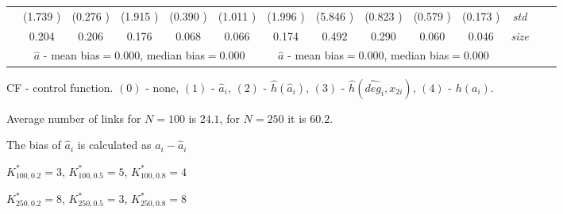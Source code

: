 \begin{table}
\begin{threeparttable}
{\begin{tabular}{|c|c|c|c|c|c|c|c|c|c|c|c|c|c|}
&(1.739 )&(0.276 )&(1.915 )&(0.390 )&(1.011 )&(1.996 )&(5.846 )&(0.823 )&(0.579 )&(0.173 )&\textit{std}\\ 
& 0.204 & 0.206 &0.176 &0.068 &0.066 &0.174& 0.492& 0.290 &0.060 &0.046 &\textit{size} \\\midrule 
&\multicolumn{5}{|c|}{$\hat{a}$ - mean bias$=$0.000, median bias$=$0.000 }&\multicolumn{5}{|c|}{$\hat{a}$ - mean bias$=$0.000, median bias$=$0.000 }&\\ \hline 
\end{tabular}} 
\begin{tablenotes}\tiny 
\item CF - control function. $(0)$ - none, $(1)$ - $\hat{a}_i$,  $(2)$ - $\hat{h}(\hat{a}_i)$, $(3)$ - $\hat{h}(\widehat{deg}_i,x_{2i})$, $(4)$ - $h(a_i)$. 
\item Average number of links for $N=100$ is $24.1$, for $N=250$ it is $60.2$. 
\item The bias of $\hat{a}_i$ is calculated as $a_i-\hat{a}_i$ 
\item $K^*_{100,0.2}=3$, $K^*_{100,0.5}=5$, $K^*_{100,0.8}=4$ 
\item $K^*_{250,0.2}=8$, $K^*_{250,0.5}=3$, $K^*_{250,0.8}=8$ 
  \end{tablenotes} 
\end{threeparttable} 
\end{table} 
